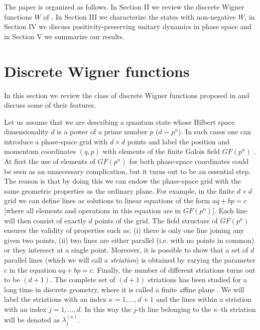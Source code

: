 \documentclass[aps,twocolumn,showpacs,nofootinbib,superscriptaddress]{revtex4}
\begin{document}
The paper is organized as follows. In Section II we review the discrete Wigner
functions $W$ of \cite{GibbonsHW04}. In Section III we characterize the states
with non-negative $W$, in Section IV we discuss positivity-preserving unitary
dynamics in phase space and in Section V we summarize our results.

\section{Discrete Wigner functions} \label{sec:wignerdef}

In this section we review the class of discrete Wigner functions proposed in
\cite{GibbonsHW04} and discuss some of their features.

Let us assume that we are describing a quantum state whose Hilbert
space dimensionality $d$ is a power of a prime number $p$
($d=p^n$). In such cases one can introduce a phase-space grid with
$d\times d$ points and label the position and momentum coordinates
$(q,p)$ with elements of the finite Galois field $GF(p^n)$
\cite{LidlN86}. At first the use of elements of $GF(p^n)$ for both
phase-space coordinates could be seen as an unnecessary
complication, but it turns out to be an essential step. The reason
is that by doing this we can endow the phase-space grid with the
same geometric properties as the ordinary plane. For example, in
the finite $d\times d$ grid we can define lines as solutions to
linear equations of the form $aq+bp=c$ [where all elements and
operations in this equation are in $GF(p^n)$]. Each line will then
consist of exactly $d$ points of the grid. The field structure of
$GF(p^n)$ ensures the validity of properties such as: (i) there is
only one line joining any given two points, (ii) two lines are
either parallel (i.e. with no points in common) or they intersect
at a single point. Moreover, it is possible to show that a set of
$d$ parallel lines (which we will call a
\textit{striation}\cite{GibbonsHW04}) is obtained by varying the
parameter $c$ in the equation $aq+bp=c$. Finally, the number of
different striations turns out to be $(d+1)$. The complete set of
$(d+1)$ striations has been studied for a long time in discrete
geometry, where it is called a finite affine plane
\cite{Wootters04b, LidlN86}. We will label the striations with an
index $\kappa=1,\ldots ,d+1$ and the lines within a striation with
an index $j=1,\ldots,d$. In this way the $j$-th line belonging to
the $\kappa$--th striation will be denoted as
$\lambda^{(\kappa)}_j$.
\end{document}
